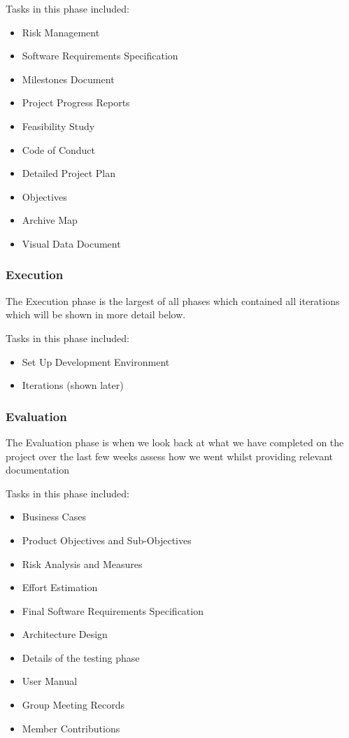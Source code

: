 Tasks in this phase included:
\begin{itemize}
	\item Risk Management
	\item Software Requirements Specification
	\item Milestones Document
	\item Project Progress Reports
	\item Feasibility Study
	\item Code of Conduct
	\item Detailed Project Plan
	\item Objectives
	\item Archive Map
	\item Visual Data Document
\end{itemize}

\subsubsection{Execution}

The Execution phase is the largest of all phases which contained all iterations which will be shown in more detail below.

Tasks in this phase included:
\begin{itemize}
	\item Set Up Development Environment
	\item Iterations (shown later)
\end{itemize}

\subsubsection{Evaluation}

The Evaluation phase is when we look back at what we have completed on the project over the last few weeks assess how we went whilst providing relevant documentation

Tasks in this phase included:
\begin{itemize}
	\item Business Cases
	\item Product Objectives and Sub-Objectives
	\item Risk Analysis and Measures
	\item Effort Estimation
	\item Final Software Requirements Specification
	\item Architecture Design
	\item Details of the testing phase
	\item User Manual
	\item Group Meeting Records
	\item Member Contributions 
\end{itemize}



